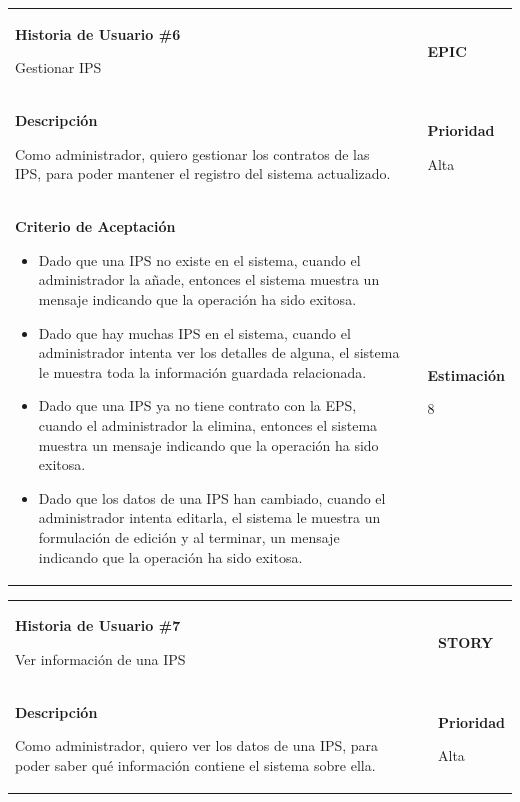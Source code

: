 \documentclass[12pt,a4paper]{article}
\begin{document}
\begin{center}
\begin{tabular}{|>{\columncolor[RGB]{215, 215, 215}} p{10cm} >{\columncolor[RGB]{215, 215, 215}} c >{\columncolor[RGB]{215, 215, 215}} p{2.5cm}|}
\hline 
\textbf{Historia de Usuario \#6}

Gestionar IPS & & \textbf{{\Large EPIC}} \\ 
\textbf{Descripción}

Como administrador, quiero gestionar los contratos de las IPS, para poder
mantener el registro del sistema actualizado. &  & \textbf{Prioridad}

Alta\\

\textbf{Criterio de Aceptación}

\begin{itemize}
\item Dado que una IPS no existe en el sistema, cuando el
administrador la añade, entonces el sistema muestra un mensaje
indicando que la operación ha sido exitosa.
\item Dado que hay muchas IPS en el sistema, cuando el administrador
intenta ver los detalles de alguna, el sistema le muestra toda la
información guardada relacionada.
\item Dado que una IPS ya no tiene contrato con la EPS, cuando el
administrador la elimina, entonces el sistema muestra un
mensaje indicando que la operación ha sido exitosa.
\item Dado que los datos de una IPS han cambiado, cuando el
administrador intenta editarla, el sistema le muestra un
formulación de edición y al terminar, un mensaje indicando que
la operación ha sido exitosa.
\end{itemize} & & \textbf{Estimación}

8 \\ 
\hline 
\end{tabular}
\vspace{5mm}

\begin{tabular}{| p{10cm} c p{2.5cm}|}
\hline 
\textbf{Historia de Usuario \#7}

Ver información de una IPS & & \textbf{{\Large STORY}} \\ 
\textbf{Descripción}

Como administrador, quiero ver los datos de una IPS, para poder saber
qué información contiene el sistema sobre ella. &  & \textbf{Prioridad}

Alta\\


\end{tabular}
\end{center}
\end{document}
